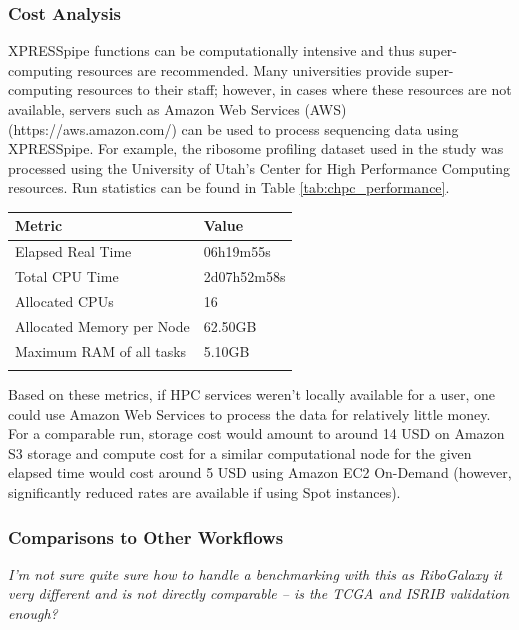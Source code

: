\documentclass[11pt, a4paper, oneside]{article}
\begin{document}
\subsubsection{Cost Analysis}
XPRESSpipe functions can be computationally intensive and thus super-computing resources are recommended. Many universities provide super-computing resources to their staff; however, in cases where these resources are not available, servers such as Amazon Web Services (AWS) (https://aws.amazon.com/) can be used to process sequencing data using XPRESSpipe. For example, the ribosome profiling dataset used in the study was processed using the University of Utah's Center for High Performance Computing resources. Run statistics can be found in Table \ref{tab:chpc_performance}.

\begin{tabular}{p{5cm}p{3cm}}
\textbf{Metric} & \textbf{Value} \\
\hline
 Elapsed Real Time & 06h19m55s \\
 \hline
 Total CPU Time & 2d07h52m58s  \\
 \hline
 Allocated CPUs & 16 \\
 \hline
 Allocated Memory per Node & 62.50GB \\
 \hline
 Maximum RAM of all tasks & 5.10GB \\
 \label{tab:chpc_performance}
\end{tabular}
\newline

Based on these metrics, if HPC services weren't locally available for a user, one could use Amazon Web Services to process the data for relatively little money. For a comparable run, storage cost would amount to around 14 USD on Amazon S3 storage and compute cost for a similar computational node for the given elapsed time would cost around 5 USD using Amazon EC2 On-Demand (however, significantly reduced rates are available if using Spot instances).


\subsubsection{Comparisons to Other Workflows}
\textit{I'm not sure quite sure how to handle a benchmarking with this as RiboGalaxy it very different and is not directly comparable -- is the TCGA and ISRIB validation enough?}
\end{document}
